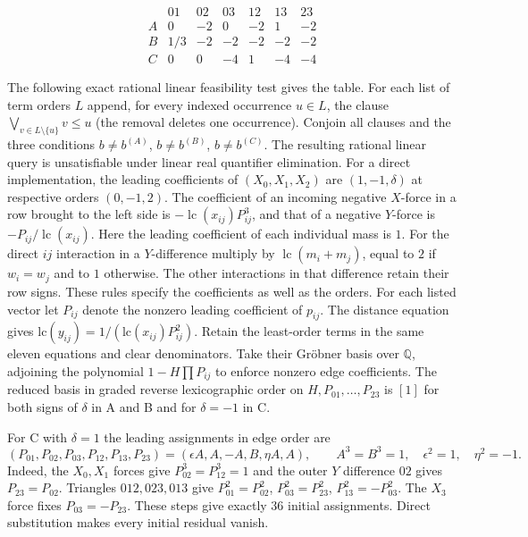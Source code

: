 \documentclass[11pt,letterpaper]{article}
\theoremstyle{definition}
\begin{document}
\[
\begin{array}{c|rrrrrr}
 &01&02&03&12&13&23\\ \hline
 A&0&-2&0&-2&1&-2\\ B&1/3&-2&-2&-2&-2&-2\\ C&0&0&-4&1&-4&-4
\end{array}
\]

The following exact rational linear feasibility test gives the table. For each
list of term orders $L$ append, for every indexed occurrence $u\in L$, the
clause $\bigvee_{v\in L\setminus\{u\}} v\le u$ (the removal deletes one
occurrence). Conjoin all clauses and the three conditions $b\ne b^{(A)}$,
$b\ne b^{(B)}$, $b\ne b^{(C)}$. The resulting rational linear query is
unsatisfiable under linear real quantifier elimination. For a direct implementation, the leading coefficients of
$(X_0,X_1,X_2)$ are $(1,-1,\delta)$ at respective orders $(0,-1,2)$.
The coefficient of an incoming negative $X$-force in a row brought to
the left side is $-\operatorname{lc}(x_{ij})P_{ij}^3$, and that of a
negative $Y$-force is $-P_{ij}/\operatorname{lc}(x_{ij})$. Here the
leading coefficient of each individual mass is $1$. For the direct
$ij$ interaction in a $Y$-difference multiply by
$\operatorname{lc}(m_i+m_j)$, equal to $2$ if $w_i=w_j$ and to $1$
otherwise. The other interactions in that difference retain their row
signs. These rules specify the coefficients as well as the orders. For each listed vector let $P_{ij}$ denote the nonzero leading coefficient of $p_{ij}$. The distance equation gives $\mathrm{lc}(y_{ij})=1/(\mathrm{lc}(x_{ij})P_{ij}^2)$. Retain the least-order terms in the same eleven equations and clear denominators. Take their Gröbner basis over $\mathbb Q$, adjoining the polynomial $1-H\prod P_{ij}$ to enforce nonzero edge coefficients. The reduced basis in graded reverse lexicographic order on $H,P_{01},\ldots,P_{23}$ is $[1]$ for both signs of $\delta$ in A and B and for $\delta=-1$ in C.

For C with $\delta=1$ the leading assignments in edge order are
\[
(P_{01},P_{02},P_{03},P_{12},P_{13},P_{23})=
(\epsilon A,A,-A,B,\eta A,A),
\qquad A^3=B^3=1,\quad \epsilon^2=1,\quad\eta^2=-1.
\]
Indeed, the $X_0,X_1$ forces give $P_{02}^3=P_{12}^3=1$ and the outer $Y$ difference $02$ gives $P_{23}=P_{02}$. Triangles $012,023,013$ give $P_{01}^2=P_{02}^2$, $P_{03}^2=P_{23}^2$, $P_{13}^2=-P_{03}^2$. The $X_3$ force fixes $P_{03}=-P_{23}$. These steps give exactly 36 initial assignments. Direct substitution makes every initial residual vanish.
\end{document}
